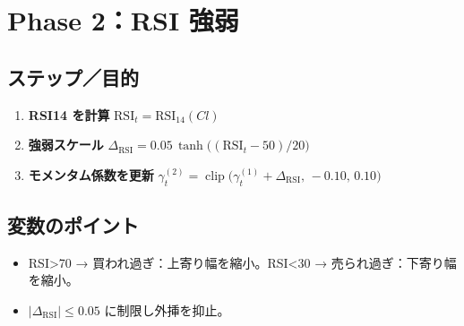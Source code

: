 
\section*{Phase 2：RSI 強弱}\nopagebreak[4]
\subsection*{ステップ／目的}
\begin{flushleft}
\begin{enumerate}
  \item \textbf{RSI14 を計算}\;
        \( \text{RSI}_t=\text{RSI}_{14}(Cl) \)
  \item \textbf{強弱スケール}\;
        \( \Delta_{\text{RSI}}=0.05\,\tanh\!\bigl((\text{RSI}_t-50)/20\bigr) \)
  \item \textbf{モメンタム係数を更新}\;
        \( \gamma_t^{(2)}=\operatorname{clip}\!\bigl(
           \gamma_t^{(1)}+\Delta_{\text{RSI}},\,-0.10,\,0.10\bigr) \)
\end{enumerate}
\end{flushleft}

\subsection*{変数のポイント}
\begin{flushleft}
\begin{itemize}
  \item RSI>70 → 買われ過ぎ：上寄り幅を縮小。RSI<30 → 売られ過ぎ：下寄り幅を縮小。  
  \item \(|\Delta_{\text{RSI}}|\le0.05\) に制限し外挿を抑止。
\end{itemize}
\end{flushleft}

